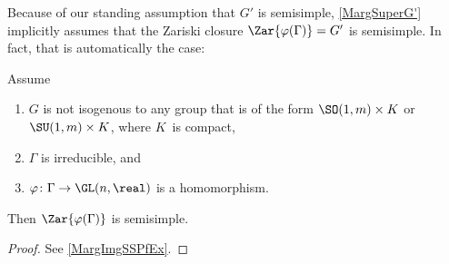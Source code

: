 Because of our standing assumption  that $G'$ is semisimple, \cref{MargSuperG'} implicitly assumes that the Zariski closure $\Zar{\varphi(\Gamma)} = G'$ is semisimple. In fact, that is automatically the case:
  
 \begin{cor} \label{MargImgSS}
 Assume
 \noprelistbreak
 	\begin{enumerate} \renewcommand{\theenumi}{\roman{enumi}}
	\item  \label{MargImgSS-notSOSU}
	$G$ is not isogenous to any group that is of the form\/ $\SO(1,m) \times K$ or\/ $\SU(1,m) \times K$, where $K$~is compact,
	\item  \label{MargImgSS-irred}
	 $\Gamma$ is irreducible,
	 and
 	\item \label{MargImgSS-phi}
	$\varphi \colon \Gamma \to \GL(n,\real)$ is a homomorphism.
	\end{enumerate}
Then\/ $\Zar{\varphi(\Gamma)}$ is semisimple.
\end{cor}

\begin{proof}
See \cref{MargImgSSPfEx}.
\end{proof}



